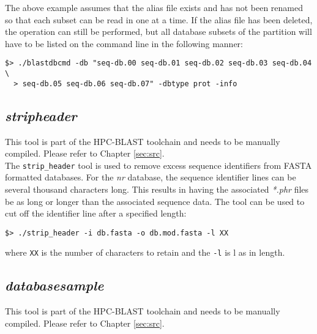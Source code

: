 \documentclass[10pt]{article}
\begin{document}
 The above example assumes that the alias file exists and has not been renamed so that each subset can be read in one at a time. If the alias file has been deleted, the operation can still be performed, but all database subsets
of the partition will have to be listed on the command line in the following manner:
\begin{verbatim}
$> ./blastdbcmd -db "seq-db.00 seq-db.01 seq-db.02 seq-db.03 seq-db.04 \
  > seq-db.05 seq-db.06 seq-db.07" -dbtype prot -info
\end{verbatim}

\subsection{\emph{strip\textunderscore header}} \label{sssec:stripheader}

 This tool is part of the HPC-BLAST toolchain and needs to be manually compiled.  Please refer to Chapter \ref{sec:src}.\\

The \verb^strip_header^ tool is used to remove excess sequence identifiers from FASTA formatted databases.  For the \emph{nr} database, the sequence identifier lines can be several thousand characters long.  This results in having the
associated \emph{*.phr} files be as long or longer than the associated sequence data.  The tool can be used to cut off the identifier line after a specified length:
\begin{verbatim}
$> ./strip_header -i db.fasta -o db.mod.fasta -l XX
\end{verbatim}
\noindent where \verb^XX^ is the number of characters to retain and the \verb^-l^ is l as in length.

\subsection{\emph{database\textunderscore sample}} \label{ssec:datadist}

 This tool is part of the HPC-BLAST toolchain and needs to be manually compiled.  Please refer to Chapter \ref{sec:src}.\\
\end{document}
